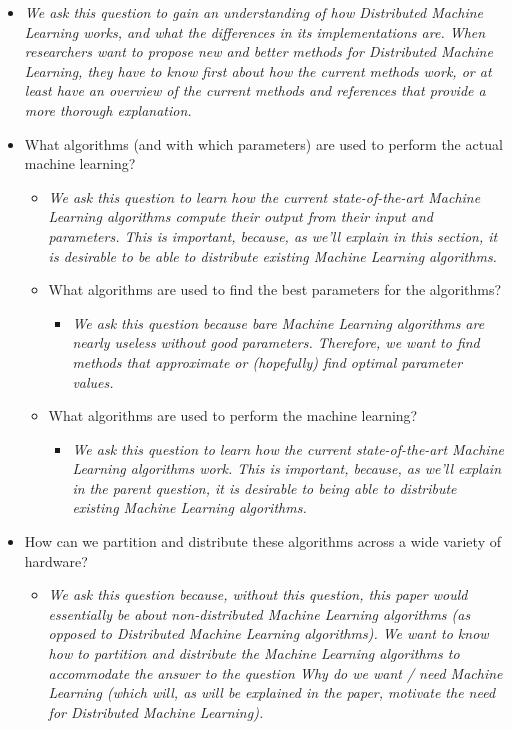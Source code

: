 \begin{itemize}
	\begin{itemize}
		\item \textit{We ask this question to gain an understanding of how Distributed Machine Learning works, and what the differences in its implementations are. When researchers want to propose new and better methods for Distributed Machine Learning, they have to know first about how the current methods work, or at least have an overview of the current methods and references that provide a more thorough explanation.}
		\item What algorithms (and with which parameters) are used to perform the actual machine learning?
		\begin{itemize}
			\item \textit{We ask this question to learn how the current state-of-the-art Machine Learning algorithms compute their output from their input and parameters. This is important, because, as we’ll explain in this section, it is desirable to be able to distribute existing Machine Learning algorithms.}
			\item What algorithms are used to find the best parameters for the algorithms?
			\begin{itemize}
				\item \textit{We ask this question because bare Machine Learning algorithms are nearly useless without good parameters. Therefore, we want to find methods that approximate or (hopefully) find optimal parameter values.}
			\end{itemize}
			\item What algorithms are used to perform the machine learning?
			\begin{itemize}
				\item \textit{We ask this question to learn how the current state-of-the-art Machine Learning algorithms work. This is important, because, as we’ll explain in the parent question, it is desirable to being able to distribute existing Machine Learning algorithms.}
			\end{itemize}
		\end{itemize}
		\item How can we partition and distribute these algorithms across a wide variety of hardware?
		\begin{itemize}
			\item \textit{We ask this question because, without this question, this paper would essentially be about non-distributed Machine Learning algorithms (as opposed to Distributed Machine Learning algorithms). We want to know how to partition and distribute the Machine Learning algorithms to accommodate the answer to the question Why do we want / need Machine Learning (which will, as will be explained in the paper, motivate the need for Distributed Machine Learning).}

\end{itemize}
\end{itemize}
\end{itemize}

